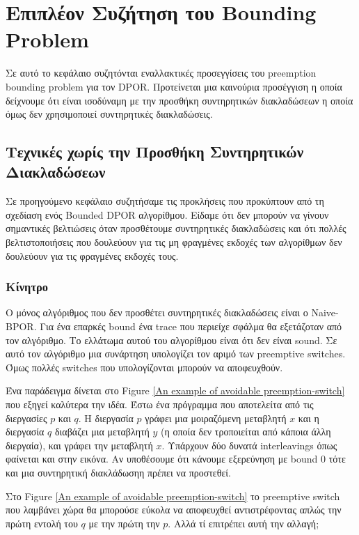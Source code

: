 \chapter{Επιπλέον Συζήτηση του Bounding Problem}
\label{Chapter 5}

Σε αυτό το κεφάλαιο συζητόνται εναλλακτικές προσεγγίσεις του preemption bounding problem για τον DPOR.
Προτείνεται μια καινούρια προσέγγιση η οποία δείχνουμε ότι είναι ισοδύναμη με την προσθήκη συντηρητικών διακλαδώσεων η οποία όμως δεν χρησιμοποιεί 
συντηρητικές διακλαδώσεις.

\section{Τεχνικές χωρίς την Προσθήκη Συντηρητικών Διακλαδώσεων}

Σε προηγούμενο κεφάλαιο συζητήσαμε τις προκλήσεις που προκύπτουν από τη σχεδίαση ενός Bounded DPOR αλγορίθμου. Είδαμε ότι δεν μπορούν να γίνουν
σημαντικές βελτιώσεις όταν προσθέτουμε συντηρητικές διακλαδώσεις και ότι πολλές βελτιστοποιήσεις που δουλεύουν για τις μη φραγμένες εκδοχές των
αλγορίθμων δεν δουλεύουν για τις φραγμένες εκδοχές τους.

\subsection{Κίνητρο}
Ο μόνος αλγόριθμος που δεν προσθέτει συντηρητικές διακλαδώσεις είναι ο Naive-BPOR. Για ένα επαρκές bound ένα trace που περιείχε 
σφάλμα θα εξετάζοταν από τον αλγόριθμο. Το ελλάτωμα αυτού του αλγορίθμου είναι ότι δεν είναι sound.
Σε αυτό τον αλγόριθμο μια συνάρτηση υπολογίζει τον αριμό των preemptive switches. Όμως πολλές switches που υπολογίζονται μπορούν να 
αποφευχθούν.

Ένα παράδειγμα δίνεται στο Figure \ref{An example of avoidable preemption-switch} που εξηγεί καλύτερα την ιδέα. Έστω 
ένα πρόγραμμα που αποτελείτα από τις διεργασίες $p$ και $q$. Η διεργασία $p$ γράφει μια μοιραζόμενη μεταβλητή $x$ και η διεργασία $q$ διαβάζει
μια μεταβλητή $y$ (η οποία δεν τροποιείται από κάποια άλλη διεργαία), και γράφει την μεταβλητή $x$. Υπάρχουν δύο δυνατά 
interleavings όπως φαίνεται και στην εικόνα. Αν υποθέσουμε ότι κάνουμε εξερεύνηση με bound $0$ τότε και μια συντηρητική διακλάδωσηη πρέπει να 
προστεθεί.


Στο Figure \ref{An example of avoidable preemption-switch} το preemptive switch που λαμβάνει χώρα θα μπορούσε εύκολα να αποφευχθεί αντιστρέφοντας
απλώς την πρώτη εντολή του $q$ με την πρώτη την $p$. Αλλά τί επιτρέπει αυτή την αλλαγή;

